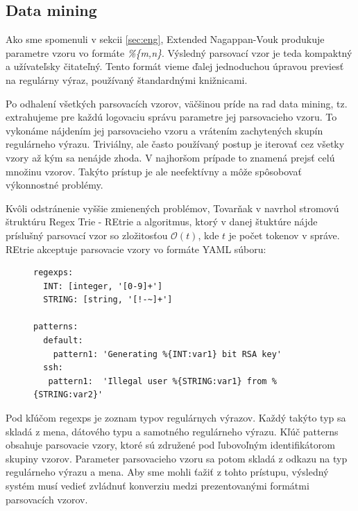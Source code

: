 \subsection{Data mining}
\label{sec:data-mining}
Ako sme spomenuli v sekcii \ref{sec:eng}, Extended Nagappan-Vouk produkuje parametre vzoru vo formáte \emph{\%\{m,n\}}. Výsledný parsovací vzor je teda kompaktný a užívateľsky čitateľný.  Tento formát vieme ďalej jednoduchou úpravou previesť na regulárny výraz, používaný štandardnými knižnicami.
\par Po odhalení všetkých parsovacích vzorov, väčšinou príde na rad data mining, tz. extrahujeme pre každú logovaciu správu parametre jej parsovacieho vzoru. To vykonáme nájdením jej parsovacieho vzoru a vrátením zachytených skupín regulárneho výrazu. Triviálny, ale často používaný postup je iterovať cez všetky vzory až kým sa nenájde zhoda. V najhoršom prípade to znamená prejsť celú množinu vzorov. Takýto prístup je ale neefektívny a môže spôsobovať výkonnostné problémy. 
\par Kvôli odstránenie vyššie zmienených problémov, Tovarňak v \parencite{regextrie} navrhol stromovú štruktúru Regex Trie - REtrie a algoritmus, ktorý v danej štuktúre nájde príslušný parsovací vzor so zložitosťou $\mathcal{O}(t)$, kde $t$ je počet tokenov v správe. REtrie akceptuje parsovacie vzory vo formáte YAML súboru:

\begin{figure}[h]
\centering
\begin{minipage}{0.9\textwidth}
\lstset{tabsize=4,columns=flexible,breaklines=true,breakatwhitespace=true, showstringspaces=false}
\begin{lstlisting}
regexps:
  INT: [integer, '[0-9]+']
  STRING: [string, '[!-~]+']
  
patterns:
  default:
    pattern1: 'Generating %{INT:var1} bit RSA key'
  ssh:
   pattern1:  'Illegal user %{STRING:var1} from %{STRING:var2}'
\end{lstlisting} 		
\end{minipage} 
\end{figure}

Pod kľúčom regexps je zoznam typov regulárnych výrazov. Každý takýto typ sa skladá z mena, dátového typu a samotného regulárneho výrazu. Kľúč patterns obsahuje parsovacie vzory, ktoré sú združené pod ľubovoľným identifikátorom skupiny vzorov. Parameter parsovacieho vzoru sa potom skladá z odkazu na typ regulárneho výrazu a mena. Aby sme mohli ťažiť z tohto prístupu, výsledný systém musí vedieť zvládnuť konverziu medzi prezentovanými formátmi parsovacích vzorov.


